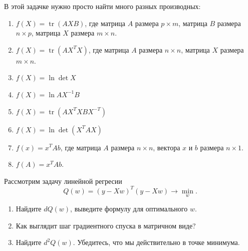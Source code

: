 \documentclass[12pt, a4paper, oneside]{article}
\theoremstyle{plain} %
\theoremstyle{definition}
\DeclareMathOperator{\tr}{tr}
\begin{document}
\begin{problem}{}
	В этой задачке нужно  просто найти много разных производных: 
	\begin{enumerate}
		
		
		\item $f(X) = \tr(AXB)$, где матрица $A$ размера $p \times m$, матрица $B$ размера $n \times p$, матрица $X$ размера $m \times n$. 
		
		\item $f(X) = \tr(AX^TX)$, где матрица $A$ размера $n \times n$, матрица $X$ размера $m \times n$. 
		
		\item $f(X) = \ln \det X$
		
		\item $f(X) = \ln AX^{-1}B$  %
		
		\item $f(X) = \tr(AX^TXBX^{-T})$
		
		\item $f(X) = \ln \det(X^TAX)$
		
		\item $f(x) = x^TAb$, где матрица $A$ размера $n \times n$, вектора $x$ и $b$ размера $n \times 1$. 
		
		\item $f(A) = x^TAb$. 
	\end{enumerate}
\end{problem}

\begin{problem}{}
	Рассмотрим задачу линейной регресии
	\[
	Q(w) = (y - Xw)^T(y - Xw) \to \min_{w}.
	\]
	
	\begin{enumerate}
		\item Найдите $dQ(w)$, выведите формулу для оптимального $w$.
		\item Как выглядит шаг градиентного спуска в матричном виде?
		\item Найдите $d^2Q(w)$. Убедитесь, что мы действительно в точке минимума. 
	\end{enumerate}
\end{problem}
\end{document}
